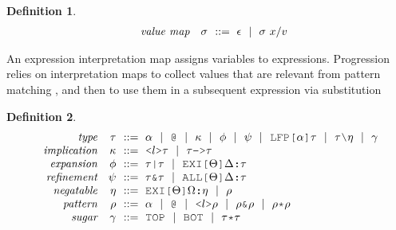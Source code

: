 \documentclass[acmsmall]{acmart}
\theoremstyle{definition}
\newtheorem{definition}{Definition}[section]
\begin{document}
\begin{definition}
  \label{def:value_map}
  \[\begin{array}[t]{rr@{}l}
    \com{value map} &
    \nonterm{\sigma} & \is \epsilon \sep \sigma\ x \slash v 
  \end{array}\]
\end{definition}

\noindent
An expression interpretation map assigns variables to expressions.
Progression relies on interpretation maps to collect
values that are relevant from pattern matching ,
and then to use them in a subsequent expression via substitution 


\begin{definition}
  \label{def:type}
  \[\begin{array}[t]{rr@{}l}
    \com{type} &
    \nonterm{\tau} & \is 
    \begin{array}[t]{@{}l}
      \alpha \sep
      \J{@} \sep
      \kappa \sep 
      \phi \sep 
      \psi \sep 
      \J{LFP[}\alpha\J{]}\tau \sep
      \tau \typdiff \eta \sep
      \gamma
    \end{array}
    \\
    \com{implication} &
    \nonterm{\kappa} & \is 
    \begin{array}[t]{@{}l}
      \J{<} l \J{>} \tau \sep 
      \tau\J{->}\tau
    \end{array}
    \\
    \com{expansion} &
    \nonterm{\phi} & \is 
    \begin{array}[t]{@{}l}
      \tau\J{|}\tau \sep 
      \J{EXI[}\Theta\J{]} \Delta \J{:} \tau
    \end{array}
    \\
    \com{refinement} &
    \nonterm{\psi} & \is 
    \begin{array}[t]{@{}l}
      \tau\J{\&}\tau \sep 
      \J{ALL[}\Theta\J{]} \Delta \J{:} \tau
    \end{array}
    \\
    \com{negatable} &
    \nonterm{\eta} & \is 
    \begin{array}[t]{@{}l}
      \J{EXI[}\Theta \J{]} \Omega \J{:} \eta \sep 
      \rho
    \end{array}
    \\
    \com{pattern} &
    \nonterm{\rho} & \is 
    \begin{array}[t]{@{}l}
      \alpha \sep
      \J{@} \sep
      \J{<}l\J{>}\rho \sep 
      \rho\J{\&}\rho \sep
      \rho\J{*}\rho
    \end{array}
    \\
    \com{sugar} &
    \nonterm{\gamma} & \is 
    \begin{array}[t]{@{}l}
      \J{TOP} \sep \J{BOT} \sep 
      \tau \J{*} \tau 
    \end{array}
  \end{array}\]
\end{definition}
\end{document}
